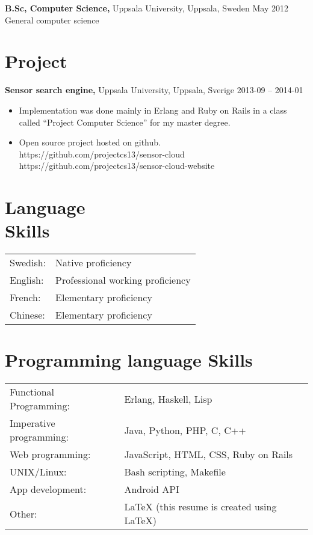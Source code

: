 \documentclass[margin]{res}
\begin{document}
\begin{resume}
{\bf B.Sc, Computer Science,} Uppsala University, Uppsala, Sweden \hfill May 2012 \\
General computer science

\newpage
\section{Project}
{\bf Sensor search engine,} Uppsala University, Uppsala, Sverige \hfill 2013-09 -- 2014-01
 \begin{itemize} \itemsep -2pt  %
 \item Implementation was done mainly in Erlang and Ruby on Rails in
   a class called ``Project Computer Science'' for my master degree.
 \item Open source project hosted on github. \\
 https://github.com/projectcs13/sensor-cloud\\
 https://github.com/projectcs13/sensor-cloud-website
 \end{itemize}

\section{Language \\ Skills}
   \begin{tabular}{l p{3in}}
    Swedish: & Native proficiency \\
    English: & Professional working proficiency \\
    French:  & Elementary proficiency \\
    Chinese:  & Elementary proficiency
 \end{tabular}

\section{Programming language Skills}
   \begin{tabular}{l p{3in}}
    Functional Programming: & Erlang, Haskell, Lisp \\
    Imperative programming: & Java, Python, PHP, C, C++ \\
    Web programming: & JavaScript, HTML, CSS, Ruby on Rails \\
    UNIX/Linux: & Bash scripting, Makefile \\
    App development: & Android API \\
    Other: & LaTeX (this resume is created using LaTeX)
 \end{tabular}


\end{resume}
\end{document}
